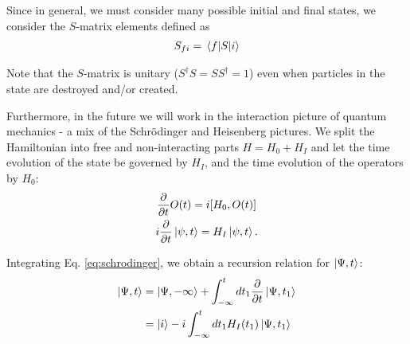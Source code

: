 \documentclass{article}
\begin{document}
Since in general, we must consider many possible initial and final states, we consider the $S$-matrix elements defined as
\begin{align}
    S_{fi} = \mel{f}{S}{i}
\end{align}

Note that the $S$-matrix is unitary ($S^\dagger S = SS^\dagger = 1$) even when particles in the state are destroyed and/or created.

Furthermore, in the future we will work in the interaction picture of quantum mechanics - a mix of the Schrödinger and Heisenberg pictures. We split the Hamiltonian into free and non-interacting parts $H = H_0 + H_I$ and let the time evolution of the state be governed by $H_I$, and the time evolution of the operators by $H_0$:
\begin{gather}
    \frac{\partial}{\partial t} O(t) = i [H_0, O(t)] \\
    i \frac{\partial}{\partial t} \ket{\psi, t} = H_I \ket{\psi, t}. \label{eq:schrodinger}
\end{gather}

Integrating Eq. \ref{eq:schrodinger}, we obtain a recursion relation for $\ket{\Psi, t}$:
\begin{align}
    \ket{\Psi, t} &= \ket{\Psi, -\infty} + \int_{-\infty}^t dt_1 \frac{\partial}{\partial t}\ket{\Psi, t_1} \\
    &= \ket{i} - i \int_{-\infty}^t dt_1 H_I(t_1) \ket{\Psi, t_1}
\end{align}
\end{document}
